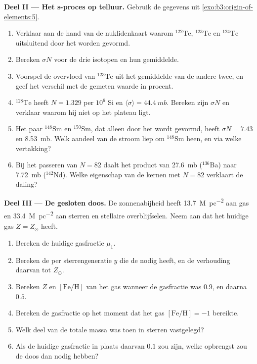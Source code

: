 \begin{problem}
\medskip\noindent\textbf{Deel II --- Het s-proces op telluur.} Gebruik
de gegevens uit \cref{exo:b3:origin-of-elements:5}.
\begin{enumerate}[resume]
\item Verklaar aan de hand van de nuklidenkaart waarom $^{122}\mathrm{Te}$,
  $^{123}\mathrm{Te}$ en $^{124}\mathrm{Te}$ uitsluitend door het  worden gevormd.
\item Bereken $\sigma N$ voor de drie isotopen en hun gemiddelde.
\item Voorspel de overvloed van $^{123}\mathrm{Te}$ uit het gemiddelde van de
  andere twee, en geef het verschil met de gemeten waarde in
  procent.
\item $^{128}\mathrm{Te}$ heeft $N = 1.329$ per $10^6$ Si en
  $\langle\sigma\rangle = \qty{44.4}{mb}$. Bereken zijn $\sigma N$ en
  verklaar waarom hij niet op het plateau ligt.
\item Het paar $^{148}\mathrm{Sm}$ en $^{150}\mathrm{Sm}$, dat alleen door het  wordt gevormd, heeft
  $\sigma N = \num{7.43}$ en \qty{8.53}{mb}. Welk aandeel van de stroom
  liep om $^{148}\mathrm{Sm}$ heen, en via welke vertakking?
\item Bij het passeren van $N = 82$ daalt het product van \qty{27.6}{mb}
  ($^{136}\mathrm{Ba}$) naar \qty{7.72}{mb} ($^{142}\mathrm{Nd}$). Welke
  eigenschap van de kernen met $N = 82$ verklaart de daling?
\end{enumerate}

\medskip\noindent\textbf{Deel III --- De gesloten doos.} De zonnenabijheid
heeft \qty{13.7}{M_\odot.pc^{-2}} aan gas en
\qty{33.4}{M_\odot.pc^{-2}} aan sterren en stellaire overblijfselen. Neem aan dat het
huidige gas $Z = Z_\odot$ heeft.
\begin{enumerate}[resume]
\item Bereken de huidige gasfractie $\mu_1$.
\item Bereken de  per sterrengeneratie $y$ die de 
  nodig heeft, en de verhouding daarvan tot $Z_\odot$.
\item Bereken $Z$ en $[\mathrm{Fe/H}]$ van het gas wanneer de gasfractie
  was $0.9$, en daarna $0.5$.
\item Bereken de gasfractie op het moment dat het gas
  $[\mathrm{Fe/H}] = -1$ bereikte.
\item Welk deel van de totale massa was toen in sterren vastgelegd?
\item Als de huidige gasfractie in plaats daarvan $0.1$ zou zijn, welke opbrengst
  zou de doos dan nodig hebben?
\end{enumerate}


\end{problem}
